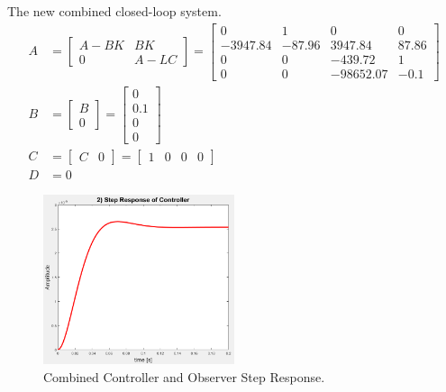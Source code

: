 \documentclass[11pt]{article}
\begin{document}
\begin{enumerate}[label=\textbf{\arabic*.}]
  The new combined closed-loop system.
  \begin{equation}
    \begin{split}
      A &= 
      \begin{bmatrix}
        A-BK & BK \\ 0 & A-LC
      \end{bmatrix}
      =
      \begin{bmatrix}
        0 & 1 & 0 & 0 \\
        -3947.84 & -87.96 & 3947.84 & 87.86 \\
        0 & 0 & -439.72 & 1 \\
        0 & 0 & -98652.07 & -0.1
      \end{bmatrix} \\
      B &=
      \begin{bmatrix}
        B \\ 0
      \end{bmatrix}
      =
      \begin{bmatrix}
        0 \\ 0.1 \\ 0 \\ 0
      \end{bmatrix} \\
      C &=
      \begin{bmatrix}
        C & 0
      \end{bmatrix}
      =
      \begin{bmatrix}
        1 & 0 & 0 & 0
      \end{bmatrix} \\
      D &= 0
    \end{split}
  \end{equation}
  \begin{figure}[H]
    \centering
    \includegraphics[width=0.5\textwidth]{p3.png}
    \caption{Combined Controller and Observer Step Response.}
  \end{figure}


\end{enumerate}
\end{document}
